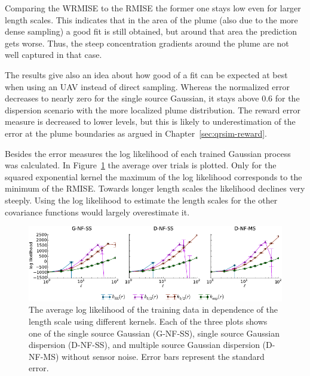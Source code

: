 Comparing the WRMISE to the RMISE the former one stays low even for larger 
length scales. This indicates that in the area of the plume (also due to the 
more dense sampling) a good fit is still obtained, but around that area the 
prediction gets worse. Thus, the steep concentration gradients around the plume 
are not well captured in that case.

The results give also an idea about how good of a fit can be expected at best 
when using an UAV instead of direct sampling. Whereas the normalized error 
decreases to nearly zero for the single source Gaussian, it stays above 0.6 for 
the dispersion scenario with the more localized plume distribution. The reward 
error measure is decreased to lower levels, but this is likely to 
underestimation of the error at the plume boundaries as argued in 
Chapter~\ref{sec:qrsim-reward}.

Besides the error measures the log likelihood of each trained Gaussian process 
was calculated. In Figure~\ref{fig:loglikelihood} the average over trials is 
plotted. Only for the squared exponential kernel the maximum of the log 
likelihood corresponds to the minimum of the RMISE\@. Towards longer length 
scales the likelihood declines very steeply. Using the log likelihood to 
estimate the length scales for the other covariance functions would largely 
overestimate it.

\begin{figure}
    \centering
    \includegraphics{plots/loglikelihood}
    \caption[Log likelihood in dependence of the covariance function and length 
    scale]{The average log likelihood of the training data in dependence of the 
        length scale using different kernels.  Each of the three plots shows one 
        of the single source Gaussian (G-NF-SS), single source Gaussian 
        dispersion (D-NF-SS), and multiple source Gaussian dispersion (D-NF-MS) 
        without sensor noise.  Error bars represent the standard 
        error.}\label{fig:loglikelihood}
\end{figure}


